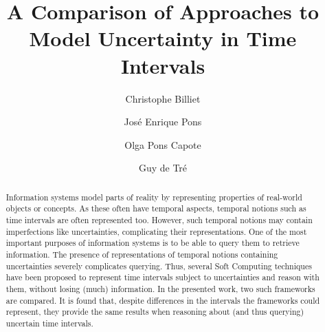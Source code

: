 \documentclass[twocolumn,a4paper]{article}
\theoremstyle{definition}
\begin{document}
\title{A Comparison of Approaches to Model Uncertainty in Time Intervals}

\begin{aug}
\author[1]{Christophe Billiet}
\author[2]{Jos\'{e} Enrique Pons}
\author[2]{Olga Pons Capote}
\author[1]{Guy de Tr\'{e}}
\end{aug}


\maketitle
\thispagestyle{empty}

\begin{abstract}
Information systems model parts of reality by representing properties of real-world objects or concepts. As these often have temporal aspects, temporal notions such as time intervals are often represented too. However, such temporal notions may contain imperfections like uncertainties, complicating their representations. One of the most important purposes of information systems is to be able to query them to retrieve information. The presence of representations of temporal notions containing uncertainties severely complicates querying. Thus, several Soft Computing techniques have been proposed to represent time intervals subject to uncertainties and reason with them, without losing (much) information. In the presented work, two such frameworks are compared. It is found that, despite differences in the intervals the frameworks could represent, they provide the same results when reasoning about (and thus querying) uncertain time intervals.
\end{abstract}
\end{document}
